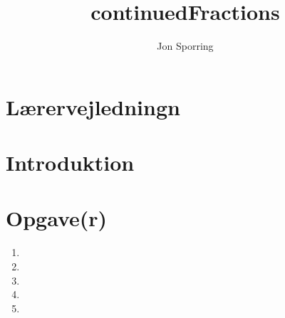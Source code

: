 \documentclass[a4paper,12pt]{article}
\title{continuedFractions}
\author{Jon Sporring}
\begin{document}
\maketitle

\section{Lærervejledningn}

\section{Introduktion}

\section{Opgave(r)}
\begin{enumerate}
\item 
\item 
\item 
\item 
\item 
\end{enumerate}
\end{document}
